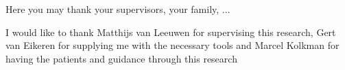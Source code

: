 


\begin{acknowledgements}

Here you may thank your supervisors, your family, ...

I would like to thank Matthijs van Leeuwen for supervising this research, Gert van Eikeren for supplying me with the necessary tools and Marcel Kolkman for having the patients and guidance through this research 

\end{acknowledgements}

